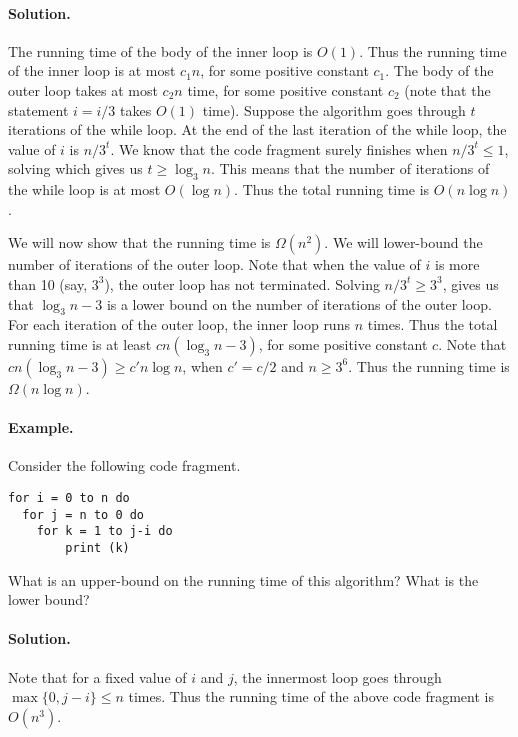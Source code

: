 \documentclass[11pt,twoside]{article}
\begin{document}
\paragraph{Solution.}
The running time of the body of the inner loop is $O(1)$. Thus the
running time of the inner loop is at most $c_1n$, for some positive constant
$c_1$. The body of the outer loop takes at most $c_2n$ time, for some
positive constant $c_2$ (note that the statement $i=i/3$ takes $O(1)$
time). Suppose the algorithm goes through $t$ iterations of the while
loop. At the end of the last iteration of the while loop, the value of $i$ is
$n/3^t$. We know that the code fragment surely finishes when
$n/3^{t}\leq 1$, solving which gives us $t\geq \log_3 n$. This means
that the number of iterations of the while loop is at most $O(\log
n)$. Thus the total running time is $O(n\log n)$.

We will now show that the running time is $\Omega(n^2)$. We will
lower-bound the number of iterations of the outer loop. Note that when
the value of $i$ is more than 10 (say, $3^3$), the outer loop has not
terminated. Solving $n/3^t\geq 3^3$, gives us that $\log_3n-3$ is a lower
bound on the number of iterations of the outer loop. For each
iteration of the outer loop, the inner loop runs $n$ times. Thus the
total running time is at least $cn(\log_3n-3)$, for some positive 
constant $c$. Note that $cn(\log_3 n-3)\geq c'n\log n$, when $c'=c/2$
and $n\geq 3^6$. Thus the running time is $\Omega(n\log n)$.

\paragraph{Example.} Consider the following code fragment.
\begin{verbatim}
for i = 0 to n do
  for j = n to 0 do
    for k = 1 to j-i do
        print (k)
\end{verbatim}
What is an upper-bound on the running time of this algorithm? What is
the lower bound?
\paragraph{Solution.}
Note that for a fixed value of $i$ and $j$, the innermost loop goes
through $\max\{0,j-i\}\leq n$ times. Thus the running time of the
above code fragment is $O(n^3)$.
\end{document}
